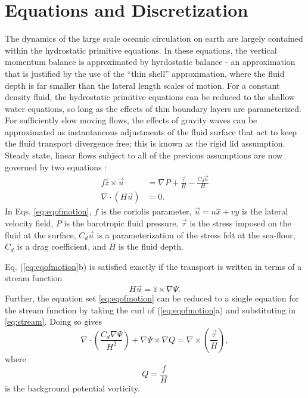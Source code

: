 \documentclass{softwaremanual}
\begin{document}
\chapter{Equations and Discretization}
The dynamics of the large scale oceanic circulation on earth are largely contained within the hydrostatic primitive equations. In these equations, the vertical momentum balance is approximated by hyrdostatic balance - an approximation that is justified by the use of the ``thin shell'' approximation, where the fluid depth is far smaller than the lateral length scales of motion. For a constant density fluid, the hydrostatic primitive equations can be reduced to the shallow water equations, so long as the effects of thin boundary layers are parameterized. For sufficiently slow moving flows, the effects of gravity waves can be approximated as instantaneous adjustments of the fluid surface that act to keep the fluid transport divergence free; this is known as the rigid lid assumption. Steady state, linear flows subject to all of the previous assumptions are now governed by two equations :
\begin{subequations}
\begin{align}
  f \hat{z} \times \vec{u} &= \nabla P + \frac{ \vec{\tau} }{H} - \frac{C_d \vec{u}}{H} \\
  \nabla \cdot \left( H \vec{u} \right) &= 0.
\end{align}\label{eq:eqofmotion}
\end{subequations}
In Eqs. \eqref{eq:eqofmotion}, $f$ is the coriolis parameter, $\vec{u} = u \hat{x} + v\hat{y}$ is the lateral velocity field, $P$ is the barotropic fluid pressure, $\vec{\tau}$ is the stress imposed on the fluid at the surface, $C_d\vec{u}$ is a parameterization of the stress felt at the sea-floor, $C_d$ is a drag coefficient, and $H$ is the fluid depth.

Eq. (\ref{eq:eqofmotion}b) is satisfied exactly if the transport is written in terms of a stream function
\begin{equation}
H \vec{u} = \hat{z} \times \nabla \Psi. \label{eq:stream}
\end{equation}
Further, the equation set \eqref{eq:eqofmotion} can be reduced to a single equation for the stream function by taking the curl of (\ref{eq:eqofmotion}a) and substituting in \eqref{eq:stream}. Doing so gives
\begin{equation}
 \nabla \cdot \left( \frac{C_d \nabla \Psi}{H^2} \right) + \nabla \Psi \times \nabla Q = \nabla \times \left( \frac{\vec{\tau}}{H} \right) ,\label{eq:eqsolved}
\end{equation} 
where 
\begin{equation}
Q = \frac{f}{H}
\end{equation}
is the background potential vorticity.
\end{document}
